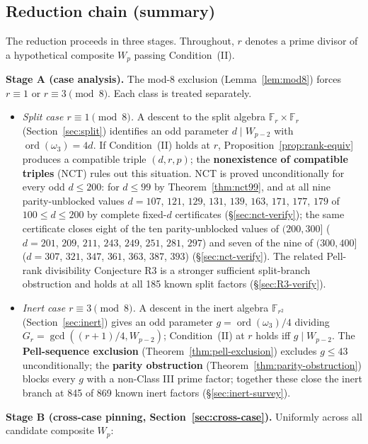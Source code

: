 \documentclass[11pt]{amsart}
\theoremstyle{plain}
\theoremstyle{definition}
\theoremstyle{remark}
\numberwithin{equation}{section}
\newcommand{\ord}{\operatorname{ord}}
\newcommand{\F}{\mathbb{F}}
\begin{document}
\subsection{Reduction chain (summary)}\label{sec:reduction-chain}

The reduction proceeds in three stages. Throughout, $r$ denotes a prime divisor of a hypothetical composite $W_p$ passing Condition~(II).

\textbf{Stage A (case analysis).} The mod-8 exclusion (Lemma~\ref{lem:mod8}) forces $r \equiv 1$ or $r \equiv 3 \pmod 8$. Each class is treated separately.

\begin{itemize}
\item \emph{Split case $r \equiv 1 \pmod 8$.} A descent to the split algebra $\F_r \times \F_r$ (Section~\ref{sec:split}) identifies an odd parameter $d \mid W_{p-2}$ with $\ord(\omega_3) = 4 d$. If Condition~(II) holds at $r$, Proposition~\ref{prop:rank-equiv} produces a compatible triple $(d,r,p)$; the \textbf{nonexistence of compatible triples} (NCT) rules out this situation. NCT is proved unconditionally for every odd $d \leq 200$: for $d \leq 99$ by Theorem~\ref{thm:nct99}, and at all nine parity-unblocked values $d = 107$, $121$, $129$, $131$, $139$, $163$, $171$, $177$, $179$ of $100 \leq d \leq 200$ by complete fixed-$d$ certificates (\S\ref{sec:nct-verify}); the same certificate closes eight of the ten parity-unblocked values of $(200, 300]$ ($d = 201$, $209$, $211$, $243$, $249$, $251$, $281$, $297$) and seven of the nine of $(300, 400]$ ($d = 307$, $321$, $347$, $361$, $363$, $387$, $393$) (\S\ref{sec:nct-verify}). The related Pell-rank divisibility Conjecture R3 is a stronger sufficient split-branch obstruction and holds at all 185 known split factors (\S\ref{sec:R3-verify}).
\item \emph{Inert case $r \equiv 3 \pmod 8$.} A descent in the inert algebra $\F_{r^2}$ (Section~\ref{sec:inert}) gives an odd parameter $g = \ord(\omega_3)/4$ dividing $G_r = \gcd((r+1)/4, W_{p-2})$; Condition~(II) at $r$ holds iff $g \mid W_{p-2}$. The \textbf{Pell-sequence exclusion} (Theorem~\ref{thm:pell-exclusion}) excludes $g \leq 43$ unconditionally; the \textbf{parity obstruction} (Theorem~\ref{thm:parity-obstruction}) blocks every $g$ with a non-Class III prime factor; together these close the inert branch at 845 of 869 known inert factors (\S\ref{sec:inert-survey}).
\end{itemize}

\textbf{Stage B (cross-case pinning, Section~\ref{sec:cross-case}).} Uniformly across all candidate composite $W_p$:
\end{document}
